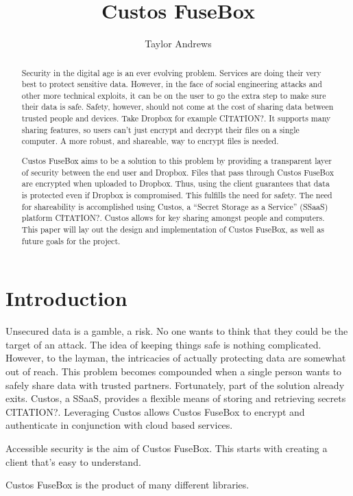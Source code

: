 \documentclass[11pt,twocolumn,letterpaper]{article}
\newcommand{\appname}{Custos FuseBox }
\newcommand{\appnameWOspace}{Custos FuseBox}
\begin{document}
\title{\appname}

\author{Taylor Andrews}

\maketitle

\begin{abstract}
Security in the digital age is an ever evolving problem.
Services are doing their very best to protect sensitive data. 
However, in the face of social engineering attacks and other more technical
exploits, it can be on the user to go the extra step to make sure
their data is safe. Safety, however, should not come at the cost of
sharing data between trusted people and devices. Take Dropbox for
example CITATION?. It supports many sharing features, so users can't just
encrypt and decrypt their files on a single computer. A more robust,
and shareable, way to encrypt files is needed. 
\par \appname aims to be a solution to this problem by providing a
transparent layer of security between the end user and Dropbox. Files
that pass through \appname are encrypted when uploaded to Dropbox. 
Thus, using the client guarantees that data is protected even if 
Dropbox is compromised. This fulfills the need for safety. The need
for shareability
is accomplished using Custos, a ``Secret Storage as a Service''
(SSaaS) platform CITATION?. Custos allows for key sharing amongst
people and computers. This paper will lay out
the design and implementation of \appnameWOspace, as well as 
future goals for the project.    
\end{abstract}

\section{Introduction}
\label{sec:intro}
Unsecured data is a gamble, a risk. No one wants to think that
they could be the target of an attack. The idea of keeping things safe
is nothing complicated. However, to the layman, the intricacies of
actually protecting data are somewhat out of reach. This problem
becomes compounded when a single person wants to safely share data
with trusted partners. Fortunately, part of the solution already exits.
Custos, a SSaaS, provides a flexible means of storing and
retrieving secrets CITATION?. Leveraging Custos allows \appname to 
encrypt and authenticate in conjunction with cloud based services.      
\par 
Accessible security is the aim of \appnameWOspace. This starts with
creating a client that's easy to understand. 
\par
\appname is the product of many different libraries. 
\end{document}
